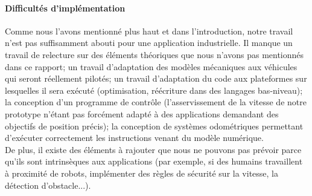 \paragraph{Difficultés d'implémentation} Comme nous l'avons mentionné plus haut et dans l'introduction, notre travail n'est pas suffisamment abouti pour une application industrielle. Il manque un travail de relecture sur des éléments théoriques que nous n'avons pas mentionnés dans ce rapport; un travail d'adaptation des modèles mécaniques aux véhicules qui seront réellement pilotés; un travail d'adaptation du code aux plateformes sur lesquelles il sera exécuté (optimisation, réécriture dans des langages bas-niveau); la conception d'un programme de contrôle (l'asservissement de la vitesse de notre prototype n'étant pas forcément adapté à des applications demandant des objectifs de position précis); la conception de systèmes odométriques permettant d'exécuter correctement les instructions venant du modèle numérique.\\
De plus, il existe des éléments à rajouter que nous ne pouvons pas prévoir parce qu'ils sont intrinsèques aux applications (par exemple, si des humains travaillent à proximité de robots, implémenter des règles de sécurité sur la vitesse, la détection d'obstacle...).

